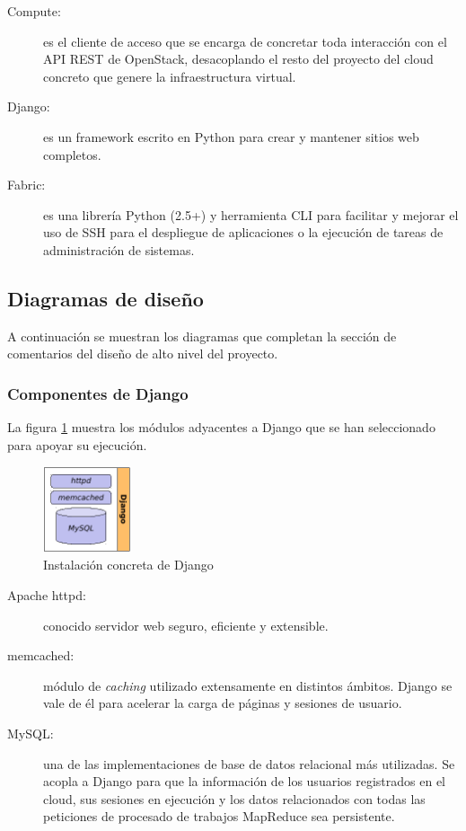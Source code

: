 \begin{description}
 \item[Compute:] es el cliente de acceso que se encarga de concretar toda interacci\'on con el API REST de OpenStack, desacoplando el resto del proyecto del cloud concreto que genere la infraestructura virtual.
 \item[Django:] es un framework escrito en Python para crear y mantener sitios web completos.
 \item[Fabric:] es una librer\'ia Python (2.5+) y herramienta CLI para facilitar y mejorar el uso de SSH para el despliegue de aplicaciones o la ejecuci\'on de tareas de administraci\'on de sistemas.
\end{description}


\subsection{Diagramas de dise\~no}\label{subsec:diagramasaltonivel}
\noindent A continuaci\'on se muestran los diagramas que completan la secci\'on de comentarios del dise\~no de alto nivel del proyecto.


\subsubsection{Componentes de Django}\label{subsubsec:componentesdjango}
\noindent La figura \ref{fig:instalaciondjango} muestra los m\'odulos adyacentes a Django que se han seleccionado para apoyar su ejecuci\'on.

\begin{figure}[bp]
\begin{center}
\includegraphics[width=0.23\textwidth]{imagenes/024.pdf}
 \caption{Instalaci\'on concreta de Django}
\label{fig:instalaciondjango}
\end{center}
\end{figure}

\begin{description}
 \item[Apache httpd:] conocido servidor web seguro, eficiente y extensible.
 \item[memcached:] m\'odulo de \emph{caching} utilizado extensamente en distintos \'ambitos. Django se vale de \'el para acelerar la carga de p\'aginas y sesiones de usuario.
 \item[MySQL:] una de las implementaciones de base de datos relacional m\'as utilizadas. Se acopla a Django para que la informaci\'on de los usuarios registrados en el cloud, sus sesiones en ejecuci\'on y los datos relacionados con todas las peticiones de procesado de trabajos MapReduce sea persistente.
\end{description}


